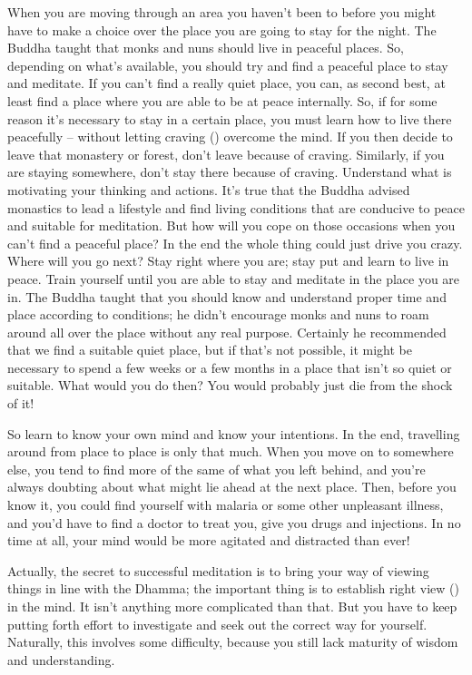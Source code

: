 When you are moving through an area you haven't been to before you might have to make a choice over the place you are going to stay for the night. The Buddha taught that monks and nuns should live in peaceful places. So, depending on what's available, you should try and find a peaceful place to stay and meditate. If you can't find a really quiet place, you can, as second best, at least find a place where you are able to be at peace internally. So, if for some reason it's necessary to stay in a certain place, you must learn how to live there peacefully -- without letting craving () overcome the mind. If you then decide to leave that monastery or forest, don't leave because of craving. Similarly, if you are staying somewhere, don't stay there because of craving. Understand what is motivating your thinking and actions. It's true that the Buddha advised monastics to lead a lifestyle and find living conditions that are conducive to peace and suitable for meditation. But how will you cope on those occasions when you can't find a peaceful place? In the end the whole thing could just drive you crazy. Where will you go next? Stay right where you are; stay put and learn to live in peace. Train yourself until you are able to stay and meditate in the place you are in. The Buddha taught that you should know and understand proper time and place according to conditions; he didn't encourage monks and nuns to roam around all over the place without any real purpose. Certainly he recommended that we find a suitable quiet place, but if that's not possible, it might be necessary to spend a few weeks or a few months in a place that isn't so quiet or suitable. What would you do then? You would probably just die from the shock of it! 

So learn to know your own mind and know your intentions. In the end, travelling around from place to place is only that much. When you move on to somewhere else, you tend to find more of the same of what you left behind, and you're always doubting about what might lie ahead at the next place. Then, before you know it, you could find yourself with malaria or some other unpleasant illness, and you'd have to find a doctor to treat you, give you drugs and injections. In no time at all, your mind would be more agitated and distracted than ever! 

Actually, the secret to successful meditation is to bring your way of viewing things in line with the Dhamma; the important thing is to establish right view () in the mind. It isn't anything more complicated than that. But you have to keep putting forth effort to investigate and seek out the correct way for yourself. Naturally, this involves some difficulty, because you still lack maturity of wisdom and understanding. 

